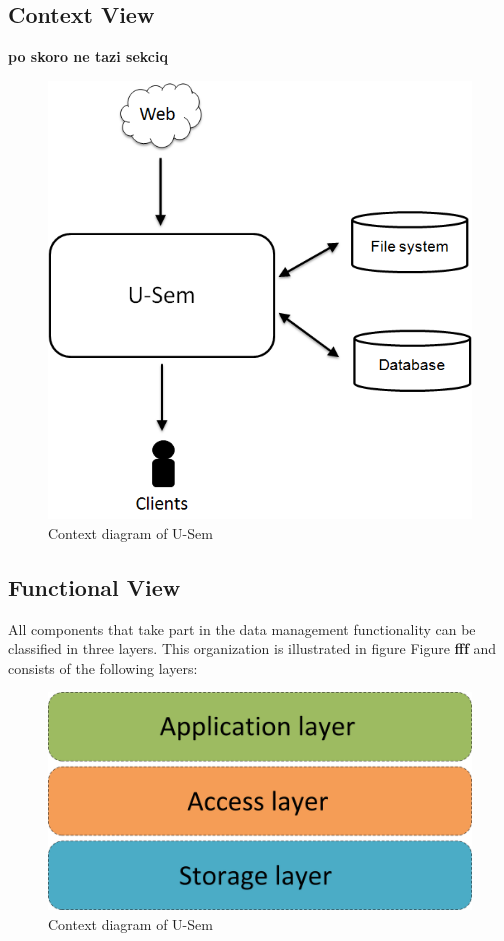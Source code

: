 \documentclass[a4paper, notitlepage]{article}
\begin{document}
\subsection{Context View}
\textbf{po skoro ne tazi sekciq}
\begin{figure}[h!]
  \centering
  	\includegraphics[scale=0.4]{environment/runtime_environment_storage.png}
  \caption{Context diagram of U-Sem }
  \label{fig_context}
\end{figure}

\subsection{Functional View}

All components that take part in the data management functionality can be classified in three layers. This organization is illustrated in figure Figure \textbf{fff} and consists of the following layers:

\begin{figure}[h!]
  \centering
  	\includegraphics[scale=0.4]{functional/layers.png}
  \caption{Context diagram of U-Sem }
  \label{fig_context}
\end{figure}
\end{document}
